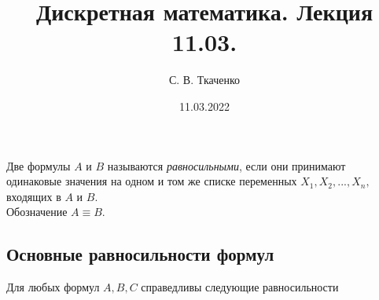 \documentclass{article}
\title{Дискретная математика. Лекция 11.03.}
\author{С. В. Ткаченко}
\date{11.03.2022}
\begin{document}
	\maketitle
	
	Две формулы $A$ и $B$ называются \textit{равносильными}, если они
	принимают одинаковые значения на одном и том же списке переменных
	$X_1, X_2, ..., X_n,$ входящих в $A$ и $B$.\\
	Обозначение $A \equiv B$.
	
	\begin{center}
		\subsection*{Основные равносильности формул}
	
	Для любых формул $A, B, C$ справедливы следующие
	равносильности
	\end{center}
	
\end{document}
